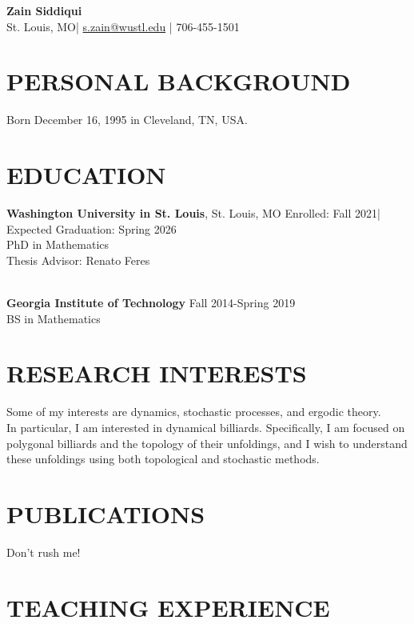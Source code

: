 \documentclass[a4paper,11pt]{extarticle}
\begin{document}
\pagestyle{empty}

\begin{center}
\textbf{\Large Zain Siddiqui}\\[2pt] %
St. Louis, MO| \href{mailto:example@example.com}{s.zain@wustl.edu} | 706-455-1501  %
\end{center}

\section{PERSONAL BACKGROUND}

Born December 16, 1995 in Cleveland, TN, USA. 

\section*{EDUCATION}
\noindent
\textbf{Washington University in St. Louis}, St. Louis, MO \hfill Enrolled: Fall 2021| Expected Graduation: Spring 2026\\ %
PhD in Mathematics\\
Thesis Advisor: Renato Feres

\noindent
\\
\textbf{Georgia Institute of Technology} \hfill Fall 2014-Spring 2019\\
BS in Mathematics
\section*{RESEARCH INTERESTS}
\noindent
Some of my interests are dynamics, stochastic processes, and ergodic theory.\\

\noindent
In particular, I am interested in dynamical billiards. Specifically, I am focused on polygonal billiards and the topology of their unfoldings, and I wish to understand these unfoldings using both topological and stochastic methods.
\section*{PUBLICATIONS}
\noindent
Don't rush me!

\section*{TEACHING EXPERIENCE}
\end{document}
